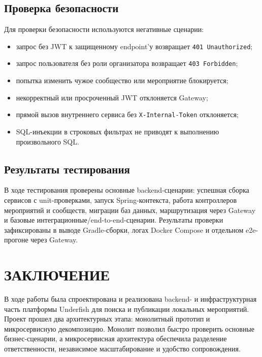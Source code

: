 \subsection{Проверка безопасности}

Для проверки безопасности используются негативные сценарии:
\begin{itemize}
    \item запрос без JWT к защищенному endpoint'у возвращает \texttt{401 Unauthorized};
    \item запрос пользователя без роли организатора возвращает \texttt{403 Forbidden};
    \item попытка изменить чужое сообщество или мероприятие блокируется;
    \item некорректный или просроченный JWT отклоняется Gateway;
    \item прямой вызов внутреннего сервиса без \texttt{X-Internal-Token} отклоняется;
    \item SQL-инъекции в строковых фильтрах не приводят к выполнению произвольного SQL.
\end{itemize}

\subsection{Результаты тестирования}

В ходе тестирования проверены основные backend-сценарии: успешная сборка сервисов с unit-проверками, запуск Spring-контекста, работа контроллеров мероприятий и сообществ, миграции баз данных, маршрутизация через Gateway и базовые интеграционные/end-to-end-сценарии. Результаты проверки зафиксированы в выводе Gradle-сборки, логах Docker Compose и отдельном e2e-прогоне через Gateway.


\section*{ЗАКЛЮЧЕНИЕ}

В ходе работы была спроектирована и реализована backend- и инфраструктурная часть платформы Underfish для поиска и публикации локальных мероприятий. Проект прошел два архитектурных этапа: монолитный прототип и микросервисную декомпозицию. Монолит позволил быстро проверить основные бизнес-сценарии, а микросервисная архитектура обеспечила разделение ответственности, независимое масштабирование и удобство сопровождения.

